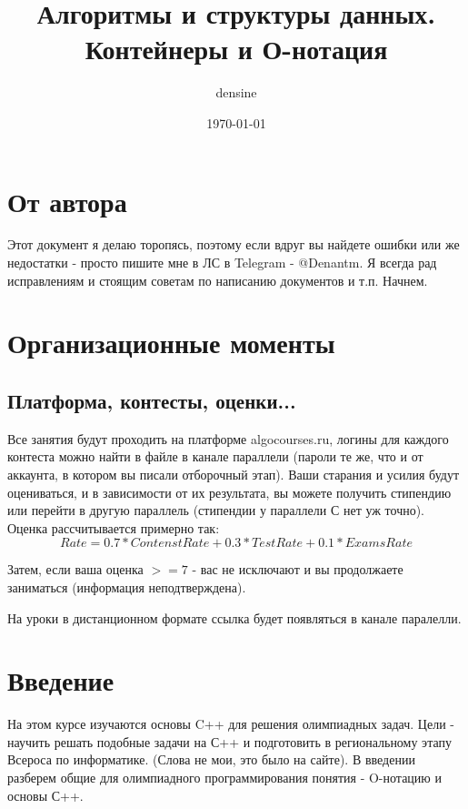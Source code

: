 \documentclass[a4paper,12pt]{article}
\title{Алгоритмы и структуры данных. Контейнеры и О-нотация}
\author{densine}
\date{\today}
\begin{document}
\maketitle
\tableofcontents

\section{От автора}
Этот документ я делаю торопясь, поэтому если вдруг вы найдете ошибки или же недостатки -
просто пишите мне в ЛС в Telegram - @Denantm. Я всегда рад исправлениям и стоящим
советам по написанию документов и т.п. Начнем.

\section{Организационные моменты}

\subsection{Платформа, контесты, оценки...}
Все занятия будут проходить на платформе algocourses.ru, логины для каждого контеста можно
найти в файле в канале параллели (пароли те же, что и от аккаунта, в котором вы писали
отборочный этап).
Ваши старания и усилия будут оцениваться, и в зависимости от их результата, вы можете получить
стипендию или перейти в другую параллель (стипендии у параллели С нет уж точно).
Оценка рассчитывается примерно так:
\[
	Rate = 0.7 * ContenstRate + 0.3 * TestRate + 0.1 * ExamsRate
\]

Затем, если ваша оценка  $>=7$ - вас не исключают и вы продолжаете заниматься (информация
неподтверждена).

На уроки в дистанционном формате ссылка будет появляться в канале паралелли.

\section{Введение}
На этом курсе изучаются основы C++ для решения олимпиадных задач. Цели - научить
решать подобные задачи на С++ и подготовить в региональному этапу Всероса по информатике.
(Слова не мои, это было на сайте). В введении разберем общие для олимпиадного
программирования понятия - O-нотацию и основы С++.
\end{document}
